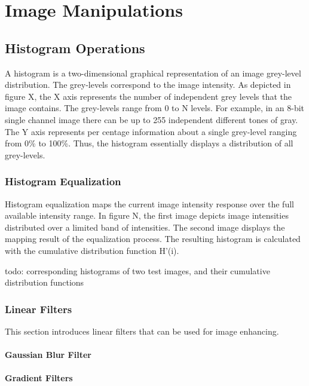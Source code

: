 \documentclass[12pt,a4paper,oneside,pdftex]{report}
\begin{document}
\chapter{Image Manipulations}
\section{Histogram Operations}

A histogram is a two-dimensional graphical representation of an image grey-level distribution. The grey-levels correspond to the image intensity. As depicted in figure X, the X axis represents the number of independent grey levels that the image contains. The grey-levels range from 0 to N levels. For example, in an 8-bit single channel image there can be up to 255 independent different tones of gray. The Y axis represents per centage information about a single grey-level ranging from 0\% to 100\%. Thus, the histogram essentially displays a distribution of all grey-levels.

\subsection{Histogram Equalization}

Histogram equalization maps the current image intensity response over the full available intensity range. In figure N, the first image depicts image intensities distributed over a limited band of intensities. The second image displays the mapping result of the equalization process. The resulting histogram is calculated with the cumulative distribution function H'(i).

todo: corresponding histograms of two test images, and their cumulative distribution functions

\subsection{Linear Filters}

This section introduces linear filters that can be used for image enhancing.

\subsubsection{Gaussian Blur Filter}

\subsubsection{Gradient Filters}
\end{document}
